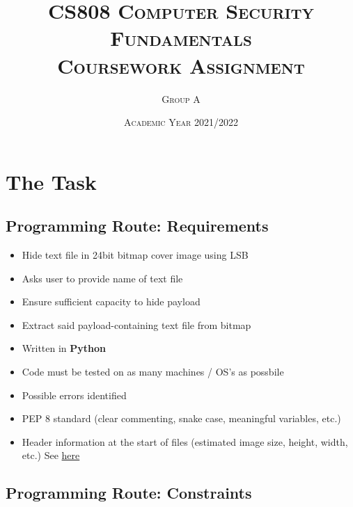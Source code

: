 \documentclass[11pt, english]{article}
\begin{document}

	\title{\textsc{CS808 Computer Security Fundamentals\\ Coursework Assignment}}
	\author{\textsc{Group A}}
	\date{\textsc{Academic Year 2021/2022}}
        \maketitle

\newpage


	\renewcommand{\contentsname}{Table of Contents}

	\tableofcontents

\newpage


\section*{The Task}

	\subsection*{Programming Route: Requirements}

	\begin{itemize}
	\setlength\itemsep{0cm}
		\item Hide text file in 24bit bitmap cover image using LSB
		\item Asks user to provide name of text file
		\item Ensure sufficient capacity to hide payload
		\item Extract said payload-containing text file from bitmap 
		\item Written in \textbf{Python}
		\item Code must be tested on as many machines / OS's as possbile
		\item Possible errors identified
		\item PEP 8 standard (clear commenting, snake case, meaningful variables, etc.)
		\item Header information at the start of files (estimated image size, height, width, etc.) See \href{www.fastgraph.com/help/bmp_header_format.html}{here}
	\end{itemize}

	\subsection*{Programming Route: Constraints}
\end{document}
